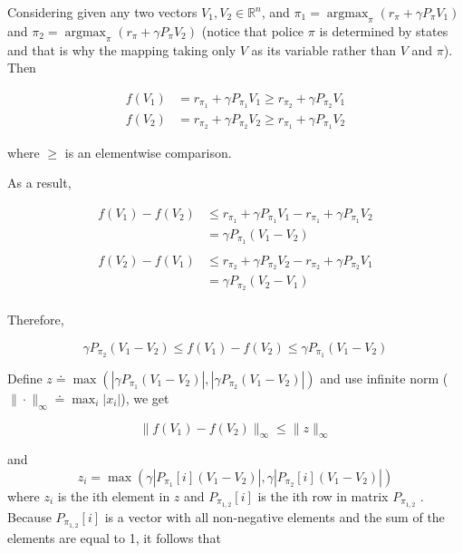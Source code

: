 Considering given any two vectors $V_1,V_2 \in \mathbb{R}^{n}$, and $\pi_{1}=\mathop{\arg\max}_{\pi}(r_{\pi}+\gamma P_{\pi}V_{1})$ and $\pi_{2}=\mathop{\arg\max}_{\pi}(r_{\pi}+\gamma P_{\pi}V_{2})$ (notice that police $\pi$ is determined by states and that is why the mapping taking only $V$ as its variable rather than $V$ and $\pi$). Then

\begin{align*} 
    f(V_{1})&=r_{\pi_{1}}+\gamma P_{\pi_{1}}V_{1} \ge r_{\pi_{2}}+\gamma P_{\pi_{2}}V_{1} \\ 
    f(V_{2})&=r_{\pi_{2}}+\gamma P_{\pi_{2}}V_{2} \ge r_{\pi_{1}}+\gamma P_{\pi_{1}}V_{2} 
\end{align*} 

where $\ge$ is an elementwise comparison. \par
As a result, 
 
\begin{align*}
    f(V_{1})-f(V_{2}) &\le r_{\pi_{1}}+\gamma P_{\pi_{1}}V_{1}-r_{\pi_{1}}+\gamma P_{\pi_{1}}V_{2} \\ 
                      &=\gamma P_{\pi_{1}}(V_{1}-V_{2})\\ \\ 
    f(V_{2})-f(V_{1}) &\le r_{\pi_{2}}+\gamma P_{\pi_{2}}V_{2}-r_{\pi_{2}}+\gamma P_{\pi_{2}}V_{1} \\
                      & =\gamma P_{\pi_{2}}(V_{2}-V_{1})  \\
\end{align*} 

Therefore, 

\begin{equation*} 
    \gamma P_{\pi_{2}}(V_{1}-V_{2})\le f(V_{1})-f(V_{2}) \le \gamma P_{\pi_{1}}(V_{1}-V_{2}) 
\end{equation*} 

Define $z\doteq\max(|\gamma P_{\pi_{1}}(V_{1}-V_{2})|, |\gamma P_{\pi_{2}}(V_{1}-V_{2})|)$ and use infinite norm ($\|\cdot\|_{\infty}\doteq\max_{i}|x_{i}|$), we get

\begin{equation*}
    \|f(V_{1})-f(V_{2})\|_{\infty}\le\|z\|_{\infty}
\end{equation*}

and
\begin{equation*}
    z_{i}=\max(\gamma|P_{\pi_{1}}[i](V_{1}-V_{2})|,\gamma|P_{\pi_{2}}[i](V_{1}-V_{2})|)
\end{equation*}
where $z_{i}$ is the ith element in $z$ and $P_{\pi_{1,2}}[i]$ is the ith row in matrix $P_{\pi_{1,2}}$ .
Because $P_{\pi_{1,2}}[i]$ is a vector with all non-negative elements and the sum of the elements are equal to 1,  it follows that

